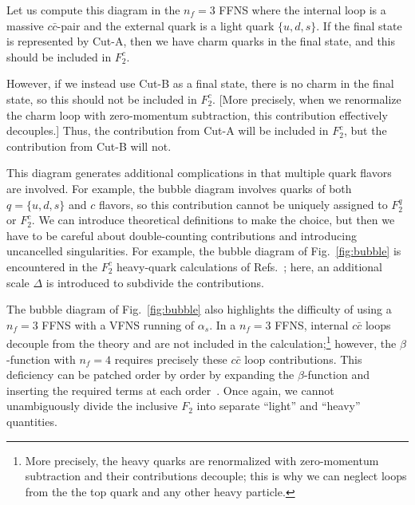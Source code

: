 Let us compute this diagram in the $n_f=3$ FFNS where the internal
loop is a massive $c\bar{c}$-pair and the external quark is a light
quark \mbox{$\{u,d,s\}$}.  If the final state is represented by Cut-A,
then we have charm quarks in the final state, and this should be
included in $F_{2}^{c}$.

However, if we instead use Cut-B as a final state, there is no charm
in the final state, so this should not be included in $F_{2}^{c}$.
[More precisely, when we renormalize the charm loop with zero-momentum
subtraction, this contribution effectively decouples.] Thus, the
contribution from Cut-A will be included in $F_{2}^{c}$, but the
contribution from Cut-B will not.

This diagram generates additional complications in that multiple quark
flavors are involved. For example, the bubble diagram involves quarks
of both $q=\{u,d,s\}$ and $c$ flavors, so this contribution cannot be
uniquely assigned to $F_{2}^{q}$ or $F_{2}^{c}$. We can introduce
theoretical definitions to make the choice, but then we have to be
careful about double-counting contributions and introducing
uncancelled singularities.
%
For example, the bubble diagram of Fig.~\ref{fig:bubble} is
encountered in the $F_{2}^{c}$ heavy-quark calculations of
Refs.~\cite{Chuvakin:1999nx,Chuvakin:2000jm}; here, an additional
scale $\Delta$ is introduced to subdivide the contributions.

%
The bubble diagram of Fig.~\ref{fig:bubble} also highlights the
difficulty of using a $n_f=3$ FFNS with a VFNS running of
$\alpha_{s}$. In a $n_f=3$ FFNS, internal $c\bar{c}$ loops decouple
from the theory and are not included in the calculation;\footnote{More
  precisely, the heavy quarks are renormalized with zero-momentum
  subtraction and their contributions decouple; this is why we can
  neglect loops from the the top quark and any other heavy particle.
} however, the $\beta$-function with $n_f=4$ requires precisely these
$c\bar{c}$ loop contributions. This deficiency can be
patched order by order by expanding the $\beta$-function and inserting
the required terms at each
order~\cite{Napoletano:2014thesis,Bierenbaum:2009zt,Cascioli:2013era}.
Once again, we cannot unambiguously divide the inclusive $F_{2}$ into
separate ``light'' and ``heavy'' quantities.

